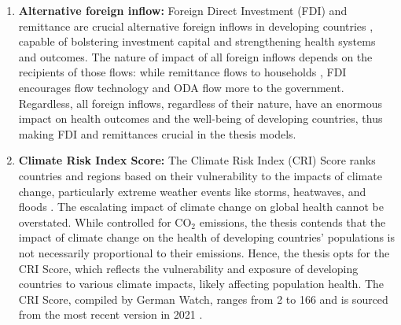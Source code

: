 \begin{enumerate}[i]
    \item \textbf{Alternative foreign inflow:} Foreign Direct Investment (FDI) and remittance are crucial alternative foreign inflows in developing countries \parencite{scott_lessons_2020}, capable of bolstering investment capital and strengthening health systems and outcomes. The nature of impact of all foreign inflows depends on the recipients of those flows: while remittance flows to households \parencite[see][]{obi2020does, gamlen2014new, de2009remittances}, FDI encourages flow technology \parencite{chung_economic_2022} and ODA flow more to the government. Regardless, all foreign inflows, regardless of their nature, have an enormous impact on health outcomes and the well-being of developing countries, thus making FDI and remittances crucial in the thesis models.   
    
    
    \item \textbf{Climate Risk Index Score:} The Climate Risk Index (CRI) Score ranks countries and regions based on their vulnerability to the impacts of climate change, particularly extreme weather events like storms, heatwaves, and floods \parencite{eckstein2021global}. The escalating impact of climate change on global health cannot be overstated. While \textcite{nwude_official_2020} controlled for CO$_2$ emissions, the thesis contends that the impact of climate change on the health of developing countries' populations is not necessarily proportional to their emissions. Hence, the thesis opts for the CRI Score, which reflects the vulnerability and exposure of developing countries to various climate impacts, likely affecting population health. The CRI Score, compiled by German Watch, ranges from 2 to 166 and is sourced from the most recent version in 2021 \parencite{eckstein2021global}. 
    

\end{enumerate}
